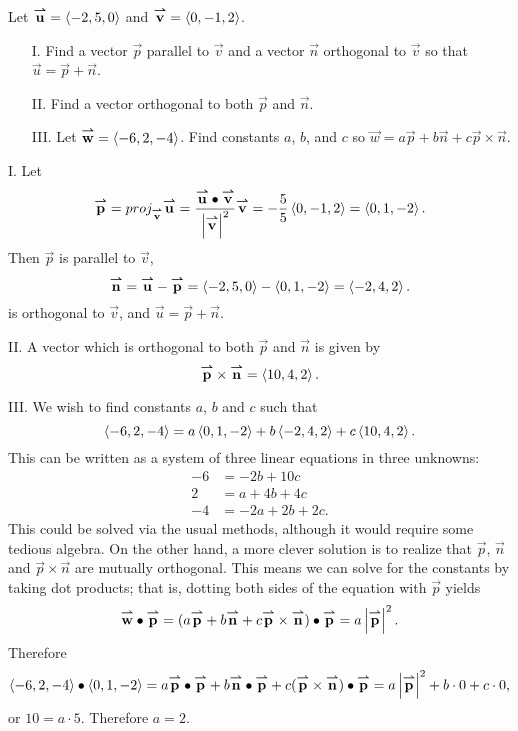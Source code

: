 \documentclass[]{ximera}
\begin{document}
\begin{problem}
Let $\vec{u} = \vector{-2,5,0}$ and $\vec{v} = \vector{0,-1,2}$. 
\begin{itemize}
\item[I.] Find a vector $\vec{p}$ parallel to $\vec{v}$ and a vector $\vec{n}$ orthogonal to $\vec{v}$ so that $\vec{u} = \vec{p} + \vec{n}$.

\item[II.]  Find a vector orthogonal to both $\vec{p}$ and $\vec{n}$.

\item[III.] Let $\vec{w} = \vector{-6,2,-4}$. Find constants $a$, $b$, and $c$ so $\vec{w} = a\vec{p}+b\vec{n}+c\vec{p} \times \vec{n}$.

\end{itemize}

\begin{solution}
I. Let 
$$
\vec{p} = proj_\vec{v} \vec{u} = \frac{\vec{u}\dotp \vec{v}}{\left|\vec{v}\right|^2} \vec{v} = -\frac{5}{5} \vector{0,-1,2} = \vector{0,1,-2}.
$$
Then $\vec{p}$ is parallel to $\vec{v}$, 
$$
\vec{n} = \vec{u} - \vec{p} = \vector{-2,5,0} - \vector{0,1,-2} = \vector{-2,4,2}.
$$
is orthogonal to $\vec{v}$, and $\vec{u} = \vec{p} + \vec{n}$.

II. A vector which is orthogonal to both $\vec{p}$ and $\vec{n}$ is given by
$$
\vec{p} \times \vec{n} = \vector{10,4,2}.
$$

III. We wish to find constants $a$, $b$ and $c$ such that 
$$
\vector{-6,2,-4} = a \vector{0,1,-2} + b \vector{-2,4,2} + c \vector{10,4,2}.
$$
This can be written as a system of three linear equations in three unknowns:
\begin{align*}
-6 &= -2b + 10c \\
2 &= a + 4b + 4c \\
-4 &= -2a + 2b + 2c.
\end{align*}
This could be solved via the usual methods, although it would require some tedious algebra. On the other hand, a more clever solution is to realize that $\vec{p}$, $\vec{n}$ and $\vec{p} \times \vec{n}$ are mutually orthogonal. This means we can solve for the constants by taking dot products; that is, dotting both sides of the equation with $\vec{p}$ yields
$$
\vec{w} \dotp \vec{p} = (a\vec{p}+b\vec{n}+c\vec{p} \times \vec{n})\dotp \vec{p} = a \left|\vec{p}\right|^2.
$$
Therefore
$$
\vector{-6,2,-4} \dotp \vector{0,1,-2} = a \vec{p} \dotp \vec{p} + b \vec{n} \dotp \vec{p} + c (\vec{p} \times \vec{n})\dotp \vec{p} = a \left|\vec{p}\right|^2 + b \cdot 0 + c \cdot 0,
$$
or $10 = a \cdot 5$. Therefore $a=2$. 


\end{solution}
\end{problem}
\end{document}
